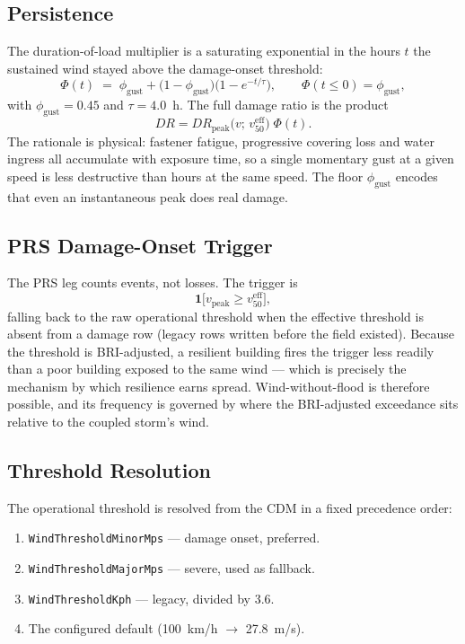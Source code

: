 \documentclass[11pt,a4paper]{article}
\begin{document}
\subsection{Persistence}
The duration-of-load multiplier is a saturating exponential in the hours $t$
the sustained wind stayed above the damage-onset threshold:
\[
  \Phi(t) \;=\; \phi_{\text{gust}}
    + \bigl(1 - \phi_{\text{gust}}\bigr)\bigl(1 - e^{-t/\tau}\bigr),
  \qquad \Phi(t \le 0) = \phi_{\text{gust}},
\]
with $\phi_{\text{gust}} = 0.45$ and $\tau = 4.0$~h. The full damage ratio is
the product
\[
  DR = DR_{\text{peak}}\bigl(v;\, v_{50}^{\text{eff}}\bigr)\;\Phi(t).
\]
The rationale is physical: fastener fatigue, progressive covering loss and water
ingress all accumulate with exposure time, so a single momentary gust at a given
speed is less destructive than hours at the same speed. The floor
$\phi_{\text{gust}}$ encodes that even an instantaneous peak does real damage.

\subsection{PRS Damage-Onset Trigger}
The PRS leg counts events, not losses. The trigger is
\[
  \mathbf{1}\bigl[v_{\text{peak}} \ge v_{50}^{\text{eff}}\bigr],
\]
falling back to the raw operational threshold when the effective threshold is
absent from a damage row (legacy rows written before the field existed). Because
the threshold is BRI-adjusted, a resilient building fires the trigger less
readily than a poor building exposed to the same wind --- which is precisely the
mechanism by which resilience earns spread. Wind-without-flood is therefore
possible, and its frequency is governed by where the BRI-adjusted exceedance
sits relative to the coupled storm's wind.

\subsection{Threshold Resolution}
The operational threshold is resolved from the CDM in a fixed precedence order:

\begin{enumerate}
  \item \texttt{WindThresholdMinorMps} --- damage onset, preferred.
  \item \texttt{WindThresholdMajorMps} --- severe, used as fallback.
  \item \texttt{WindThresholdKph} --- legacy, divided by 3.6.
  \item The configured default (100~km/h $\to$ 27.8~m/s).
\end{enumerate}
\end{document}
